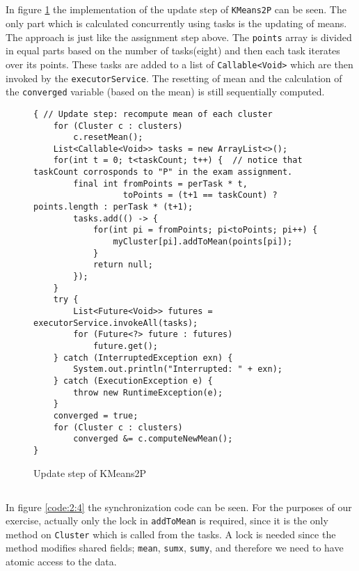 \subsection{}
In figure \ref{code:2:3} the implementation of the update step of \texttt{KMeans2P} can be seen. The only part which is calculated concurrently using tasks is the updating of means. The approach is just like the assignment step above. The \texttt{points} array is divided in equal parts based on the number of tasks(eight) and then each task iterates over its points. These tasks are added to a list of \texttt{Callable<Void>} which are then invoked by the \texttt{executorService}. The resetting of mean and the calculation of the \texttt{converged} variable (based on the mean) is still sequentially computed.

\begin{figure}
\begin{lstlisting}
{ // Update step: recompute mean of each cluster
    for (Cluster c : clusters)
        c.resetMean();
    List<Callable<Void>> tasks = new ArrayList<>();
    for(int t = 0; t<taskCount; t++) {  // notice that taskCount corrosponds to "P" in the exam assignment.
        final int fromPoints = perTask * t,
                  toPoints = (t+1 == taskCount) ? points.length : perTask * (t+1);
        tasks.add(() -> {
            for(int pi = fromPoints; pi<toPoints; pi++) {
                myCluster[pi].addToMean(points[pi]);
            }
            return null;
        });
    }
    try {
        List<Future<Void>> futures = executorService.invokeAll(tasks);
        for (Future<?> future : futures)
            future.get();
    } catch (InterruptedException exn) {
        System.out.println("Interrupted: " + exn);
    } catch (ExecutionException e) {
        throw new RuntimeException(e);
    }
    converged = true;
    for (Cluster c : clusters)
        converged &= c.computeNewMean();
}
\end{lstlisting}
\caption{Update step of KMeans2P}
\label{code:2:3}
\end{figure}

\subsection{}
In figure \ref{code:2:4} the synchronization code can be seen. For the purposes of our exercise, actually only the lock in \texttt{addToMean} is required, since it is the only method on \texttt{Cluster} which is called from the tasks. A lock is needed since the method modifies shared fields; \texttt{mean}, \texttt{sumx}, \texttt{sumy}, and therefore we need to have atomic access to the data. 

